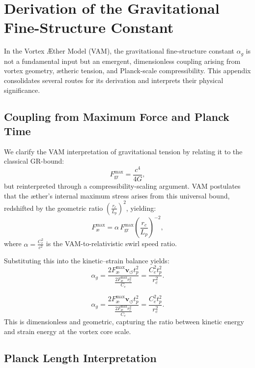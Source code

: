 \section{Derivation of the Gravitational Fine-Structure Constant}
\label{appendix:alpha_g}

In the Vortex Æther Model (VAM), the gravitational fine-structure constant $\alpha_g$ is not a fundamental input but an emergent, dimensionless coupling arising from vortex geometry, ætheric tension, and Planck-scale compressibility. This appendix consolidates several routes for its derivation and interprets their physical significance.

\subsection*{Coupling from Maximum Force and Planck Time}

We clarify the VAM interpretation of gravitational tension by relating it to the classical GR-bound:
\begin{equation}
    F^{\text{max}}_{\text{gr}} = \frac{c^4}{4G},
\end{equation}
but reinterpreted through a compressibility-scaling argument. VAM postulates that the æther's internal maximum stress arises from this universal bound, redshifted by the geometric ratio \( \left(\frac{r_c}{L_p}\right)^2 \), yielding:
\begin{equation}
    F^{\text{max}}_{\text{\ae}} = \alpha \, F^{\text{max}}_{\text{gr}} \left(\frac{r_c}{L_p}\right)^{-2}, \label{eq:FmaxVAM}
\end{equation}
where \( \alpha = \frac{C_e^2}{c^2} \) is the VAM-to-relativistic swirl speed ratio.

Substituting this into the kinetic–strain balance yields:
\begin{equation}
    \alpha_g = \frac{2 F^{\text{max}}_{\text{\ae}} \mathbf{v}_{\scriptscriptstyle\boldsymbol{\circlearrowleft}} t_p^2}{\frac{2 F^{\text{max}}_{\text{\ae}} r_c^2}{C_e}} = \frac{C_e^2 t_p^2}{r_c^2}.
\end{equation}

\[
    \alpha_g = \frac{2 F^{\text{max}}_{\text{\ae}} \mathbf{v}_{\scriptscriptstyle\boldsymbol{\circlearrowleft}} t_p^2}{\frac{2 F^{\text{max}}_{\text{\ae}} r_c^2}{C_e}} = \frac{C_e^2 t_p^2}{r_c^2}.
\]
This is dimensionless and geometric, capturing the ratio between kinetic energy and strain energy at the vortex core scale.

\subsection*{Planck Length Interpretation}

